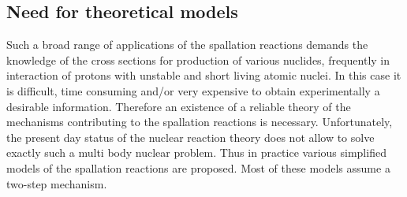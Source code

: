 	\subsection{Need for theoretical models}
	Such a broad range of applications of the spallation reactions demands the knowledge of the cross sections for production of various nuclides, frequently in interaction of protons with unstable and short living atomic nuclei. In this case it is difficult, time consuming and/or very expensive to obtain experimentally a desirable information. Therefore an existence of a reliable theory of the mechanisms contributing to the spallation reactions is necessary. Unfortunately, the present day status of the nuclear reaction theory does not allow to solve exactly such a multi body nuclear problem. Thus in practice various simplified models of the spallation reactions are proposed. Most of these models assume a two-step mechanism.

